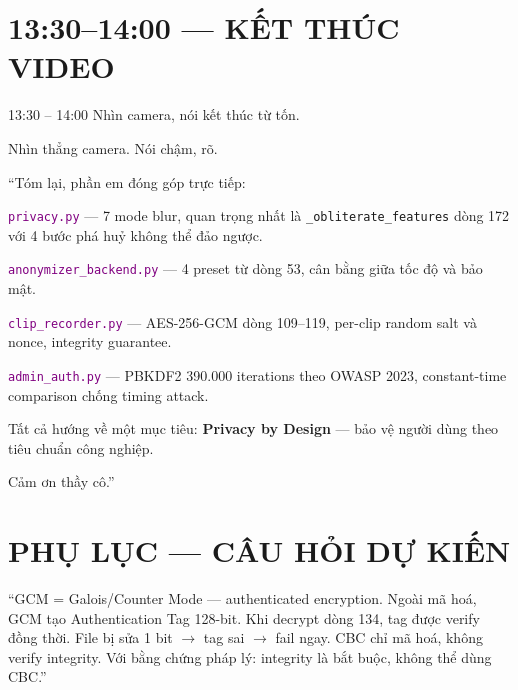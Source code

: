 \documentclass[12pt, a4paper]{article}
\newcommand{\fpath}[1]{\texttt{\textcolor{purple}{#1}}}
\begin{document}
\section{13:30--14:00 --- KẾT THÚC VIDEO}

\begin{timing}{13:30 -- 14:00}
Nhìn camera, nói kết thúc từ tốn.
\end{timing}

\begin{cam}
Nhìn thẳng camera. Nói chậm, rõ.
\end{cam}

\begin{say}
``Tóm lại, phần em đóng góp trực tiếp:

\fpath{privacy.py} --- 7 mode blur, quan trọng nhất là \texttt{\_obliterate\_features} dòng 172 với 4 bước phá huỷ không thể đảo ngược.

\fpath{anonymizer\_backend.py} --- 4 preset từ dòng 53, cân bằng giữa tốc độ và bảo mật.

\fpath{clip\_recorder.py} --- AES-256-GCM dòng 109--119, per-clip random salt và nonce, integrity guarantee.

\fpath{admin\_auth.py} --- PBKDF2 390.000 iterations theo OWASP 2023, constant-time comparison chống timing attack.

Tất cả hướng về một mục tiêu: \textbf{Privacy by Design} --- bảo vệ người dùng theo tiêu chuẩn công nghiệp.

Cảm ơn thầy cô.''
\end{say}

\section{PHỤ LỤC --- CÂU HỎI DỰ KIẾN}

\begin{tcolorbox}[colback=gray!5, colframe=BrickRed, breakable,
  title={\textbf{Q: Tại sao AES-GCM mà không phải AES-CBC?}}]
``GCM = Galois/Counter Mode --- authenticated encryption.
Ngoài mã hoá, GCM tạo Authentication Tag 128-bit.
Khi decrypt dòng 134, tag được verify đồng thời.
File bị sửa 1 bit $\to$ tag sai $\to$ fail ngay.
CBC chỉ mã hoá, không verify integrity.
Với bằng chứng pháp lý: integrity là bắt buộc, không thể dùng CBC.''
\end{tcolorbox}
\end{document}
